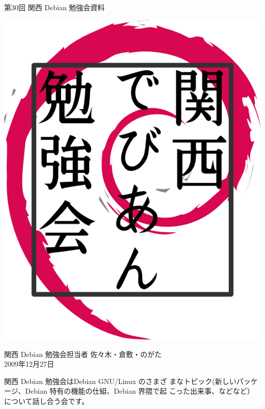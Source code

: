 \documentclass[mingoth,a4paper]{jsarticle}
\newcommand{\debmtgyear}{2009}
\newcommand{\debmtgdate}{27}
\newcommand{\debmtgmonth}{12}
\newcommand{\debmtgnumber}{30}
\begin{document}
\begin{titlepage}


 第\debmtgnumber{}回 関西 Debian 勉強会資料

\vspace{2cm}

\begin{center}
\includegraphics{image200802/kansaidebianlogo.png}
\end{center}

\begin{flushright}
\hfill{}関西 Debian 勉強会担当者 佐々木・倉敷・のがた \\
\hfill{}\debmtgyear{}年\debmtgmonth{}月\debmtgdate{}日
\end{flushright}

\thispagestyle{empty}
\end{titlepage}

 
 関西 Debian 勉強会はDebian GNU/Linux のさまざ
 まなトピック(新しいパッケージ、Debian 特有の機能の仕組、Debian 界隈で起
 こった出来事、などなど）について話し合う会です。
\end{document}
